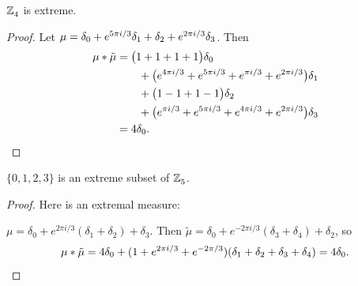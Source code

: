 \begin{prop}\label{prop4in4}
$\texttt{$\mathbb Z_{4}^{\,}$}$ is extreme. \newline \end{prop} 


\begin{proof}
Let  $\mu =  \delta_{0}+e^{5\pi i/3}\delta_{1}+\delta_{2}+e^{2\pi i/3}\delta_{3}
$.  Then 
\begin{align*} 
\mu * \tilde \mu & = \big(1+1+1+1\big)\delta_{0}
\\&\qquad
+\big(e^{4\pi i/3}+e^{5\pi i/3}+e^{\pi i/3}+e^{2\pi i/3}\big)\delta_{1}
\\&\qquad
+\big(1-1+1-1\big)\delta_{2}
\\&\qquad
+\big(e^{\pi i/3}+e^{5\pi i/3}+e^{4\pi i/3}+e^{2\pi i/3}\big)\delta_{3}\\&=4\delta_{0 }.\qedhere
\end{align*}
\end{proof}


\begin{prop}
\cite{MR627683}
\label{prop4in5}
$\{0,1,2,3\}$ is an extreme subset of $\texttt{$\mathbb Z_{5}^{\,}$}$.
\end{prop}
\begin{proof}
Here is an extremal measure:

$\mu = \delta_0+e^{2\pi i/3}(\delta_1+\delta_2) +\delta_3$.
Then 
$
\tilde\mu = \delta_0 +e^{-2\pi i/3}(\delta_3+\delta_4)+\delta_2$, so 
\[\mu*\tilde\mu = 4\delta_0+(1+e^{2\pi i/3} +e^{-2\pi/3})(\delta_1+\delta_2+\delta_3+\delta_4)\\
= 4\delta_0. \qedhere
\]
\end{proof}


